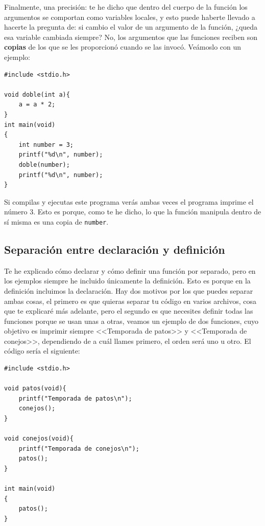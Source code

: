 \documentclass[a4paper]{article}
\begin{document}
Finalmente, una precisión: te he dicho que dentro del cuerpo de la función
los argumentos se comportan como variables locales, y esto puede haberte
llevado a hacerte la pregunta de: si cambio el valor de un argumento de la
función, ¿queda esa variable cambiada siempre? No, los argumentos que las
funciones reciben son \textbf{copias} de los que se les proporcionó cuando se
las invocó. Veámoslo con un ejemplo:


\noindent
\begin{minipage}[H]{\linewidth}
\mbox{}
\begin{lstlisting}[style=C, label={lst:functionByValue},
caption={Demostración de que una función recibe copias de sus argumentos}]
#include <stdio.h>

void doble(int a){
    a = a * 2;
}
int main(void)
{
    int number = 3;
    printf("%d\n", number);
    doble(number);
    printf("%d\n", number);
}
\end{lstlisting}
\end{minipage}

Si compilas y ejecutas este programa verás ambas veces el programa imprime el
número 3. Esto es porque, como te he dicho, lo que la función manipula dentro
de sí misma es una copia de \texttt{number}.

\subsection{Separación entre declaración y definición}
Te he explicado cómo declarar y cómo definir una función por separado, pero
en los ejemplos siempre he incluido únicamente la definición. Esto es porque en
la definición incluimos la declaración. Hay dos motivos por los que puedes
separar ambas cosas, el primero es que quieras separar tu código en varios
archivos, cosa que te explicaré más adelante, pero el segundo es que necesites
definir todas las funciones porque se usan unas a otras, veamos un ejemplo
de dos funciones, cuyo objetivo es imprimir siempre <<Temporada de patos>> y
<<Temporada de conejos>>, dependiendo de a cuál llames primero, el orden será
uno u otro. El código sería el siguiente:


\noindent
\begin{minipage}[H]{\linewidth}
\mbox{}
\begin{lstlisting}[style=C, label={lst:cyclicFunctions},
caption={Declaración no separada de definición}]
#include <stdio.h>

void patos(void){
    printf("Temporada de patos\n");
    conejos();
}

void conejos(void){
    printf("Temporada de conejos\n");
    patos();
}

int main(void)
{
    patos();
}
\end{lstlisting}
\end{minipage}
\end{document}
